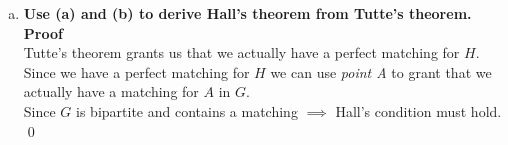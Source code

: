 \begin{enumerate}[a)]
    \item \textbf{Use (a) and (b) to derive Hall’s theorem from Tutte’s theorem.}\\
    \linebreak
    \textbf{Proof}\\
    Tutte's theorem grants us that we actually have a perfect matching for $H$. Since we have a perfect matching for $H$ we can use \textit{point A} to grant that we actually have a matching for $A$ in $G$.\\
    \linebreak
    Since $G$ is bipartite and contains a matching $\implies$ Hall's condition must hold. \qed
\end{enumerate}